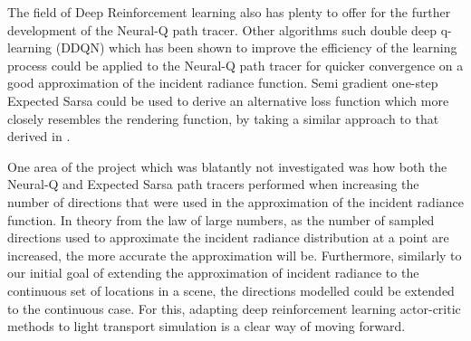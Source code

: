 \documentclass[../dissertation.tex]{subfiles}
\begin{document}
The field of Deep Reinforcement learning also has plenty to offer for the further development of the Neural-Q path tracer. Other algorithms such double deep q-learning (DDQN) \cite{van2016deep} which has been shown to improve the efficiency of the learning process could be applied to the Neural-Q path tracer for quicker convergence on a good approximation of the incident radiance function. Semi gradient one-step Expected Sarsa \cite{sutton2011reinforcement} could be used to derive an alternative loss function which more closely resembles the rendering function, by taking a similar approach to that derived in \cite{keller2019integral}. 

One area of the project which was blatantly not investigated was how both the Neural-Q and Expected Sarsa path tracers performed when increasing the number of directions that were used in the approximation of the incident radiance function. In theory from the law of large numbers, as the number of sampled directions used to approximate the incident radiance distribution at a point are increased, the more accurate the approximation will be. Furthermore, similarly to our initial goal of extending the approximation of incident radiance to the continuous set of locations in a scene, the directions modelled could be extended to the continuous case. For this, adapting deep reinforcement learning actor-critic methods \cite{lillicrap2015continuous, mnih2016asynchronous} to light transport simulation is a clear way of moving forward.
\end{document}
